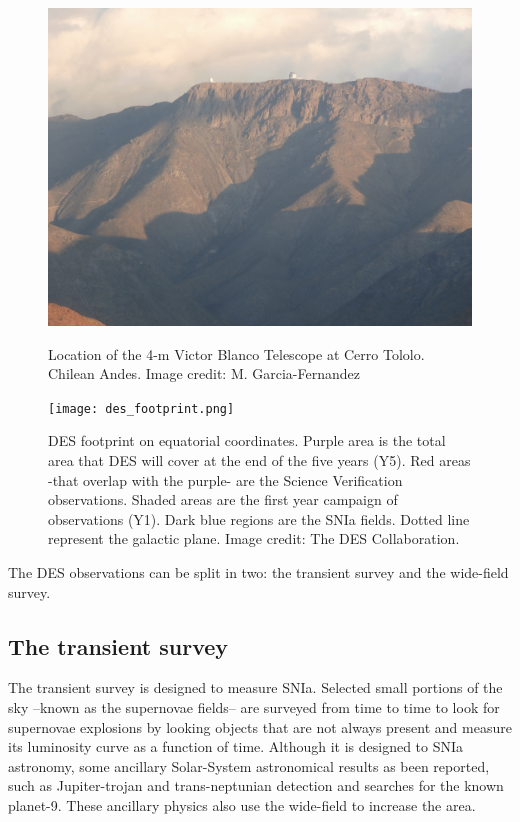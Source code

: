 \begin{figure}
\begin{center}
\includegraphics[width=\textwidth]{./Pictures/cerrotololo_mine.jpg}
\caption{Location of the 4-m Victor Blanco Telescope at Cerro Tololo. Chilean Andes. Image credit: M. Garcia-Fernandez}
\label{fig:cerrotololo}
\vspace{2cm}
\texttt{[image: des\_footprint.png]}
\caption{DES footprint on equatorial coordinates. Purple area is the total area that DES will cover at the end of the five years (Y5). Red areas -that overlap with the purple- are the Science Verification observations. Shaded areas are the first year campaign of observations (Y1). Dark blue regions are the SNIa fields. Dotted line represent the galactic plane. Image credit: The DES Collaboration.}
\label{fig:des_footprint}
\end{center}
\end{figure}

The DES observations can be split in two: the transient survey and the wide-field survey.

\subsection{The transient survey}
The transient survey is designed to measure SNIa. Selected small portions of the sky --known as the supernovae fields-- are surveyed from time to time to look for supernovae explosions by looking objects that are not always present and measure its luminosity curve as a function of time. Although it is designed to SNIa astronomy, some ancillary Solar-System astronomical results as been reported, such as Jupiter-trojan and trans-neptunian detection and searches for the known planet-9. These ancillary physics also use the wide-field to increase the area.


